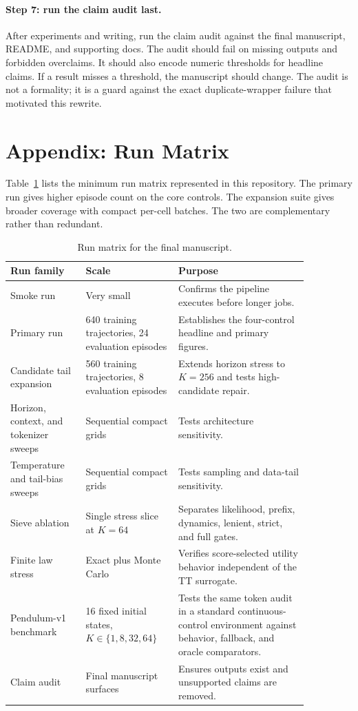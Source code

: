 \documentclass{article}
\begin{document}
\paragraph{Step 7: run the claim audit last.}
After experiments and writing, run the claim audit against the final manuscript, README, and supporting docs. The audit should fail on missing outputs and forbidden overclaims. It should also encode numeric thresholds for headline claims. If a result misses a threshold, the manuscript should change. The audit is not a formality; it is a guard against the exact duplicate-wrapper failure that motivated this rewrite.

\clearpage

\section{Appendix: Run Matrix}

Table~\ref{tab:run-matrix} lists the minimum run matrix represented in this repository. The primary run gives higher episode count on the core controls. The expansion suite gives broader coverage with compact per-cell batches. The two are complementary rather than redundant.

\begin{table}[H]
\caption{Run matrix for the final manuscript.}
\label{tab:run-matrix}
\begin{center}
\small
\begin{tabular}{p{0.22\linewidth}p{0.26\linewidth}p{0.38\linewidth}}
\toprule
Run family & Scale & Purpose \\
\midrule
Smoke run & Very small & Confirms the pipeline executes before longer jobs. \\
Primary run & 640 training trajectories, 24 evaluation episodes & Establishes the four-control headline and primary figures. \\
Candidate tail expansion & 560 training trajectories, 8 evaluation episodes & Extends horizon stress to \(K=256\) and tests high-candidate repair. \\
Horizon, context, and tokenizer sweeps & Sequential compact grids & Tests architecture sensitivity. \\
Temperature and tail-bias sweeps & Sequential compact grids & Tests sampling and data-tail sensitivity. \\
Sieve ablation & Single stress slice at \(K=64\) & Separates likelihood, prefix, dynamics, lenient, strict, and full gates. \\
Finite law stress & Exact plus Monte Carlo & Verifies score-selected utility behavior independent of the TT surrogate. \\
Pendulum-v1 benchmark & 16 fixed initial states, \(K\in\{1,8,32,64\}\) & Tests the same token audit in a standard continuous-control environment against behavior, fallback, and oracle comparators. \\
Claim audit & Final manuscript surfaces & Ensures outputs exist and unsupported claims are removed. \\
\bottomrule
\end{tabular}
\end{center}
\end{table}
\end{document}
